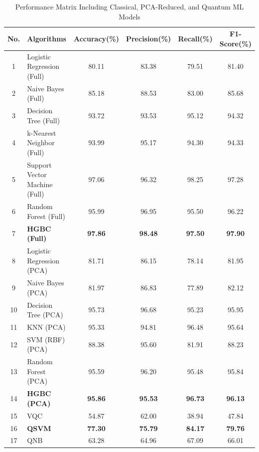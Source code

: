 \documentclass[runningheads]{llncs}
\begin{document}
\begin{table}[!ht]
    \centering
    \caption{Performance Matrix Including Classical, PCA-Reduced, and Quantum ML Models}
    \renewcommand{\arraystretch}{1.2}
    \setlength{\tabcolsep}{4pt}
    \begin{tabular}{|c|l|c|c|c|c|}
        \hline
        \textbf{No.} & \textbf{Algorithms} & \textbf{Accuracy(\%)} & \textbf{Precision(\%)} & \textbf{Recall(\%)} & \textbf{F1-Score(\%)} \\
        \hline
          1  & Logistic Regression (Full) & 80.11 & 83.38 & 79.51 & 81.40 \\
          \hline
          2 & Naive Bayes (Full) & 85.18 & 88.53 & 83.00 & 85.68 \\
          \hline
          3 & Decision Tree (Full) & 93.72 & 93.53 & 95.12 & 94.32 \\
          \hline
          4 & k-Nearest Neighbor (Full) & 93.99 & 95.17 & 94.30 & 94.33 \\
          \hline
          5 & Support Vector Machine (Full) & 97.06 & 96.32 & 98.25 & 97.28 \\
          \hline
          6 & Random Forest (Full) & 95.99 & 96.95 & 95.50 & 96.22 \\
          \hline
          7 & \textbf{HGBC (Full)} & \textbf{97.86} & \textbf{98.48} & \textbf{97.50} & \textbf{97.90} \\
          \hline
          8 & Logistic Regression (PCA) & 81.71 & 86.15 & 78.14 & 81.95 \\
          \hline
          9 & Naive Bayes (PCA) & 81.97 & 86.83 & 77.89 & 82.12 \\
          \hline
          10 & Decision Tree (PCA) & 95.73 & 96.68 & 95.23 & 95.95 \\
          \hline
          11 & KNN (PCA) & 95.33 & 94.81 & 96.48 & 95.64 \\
          \hline
          12 & SVM (RBF) (PCA) & 88.38 & 95.60 & 81.91 & 88.23 \\
          \hline
          13 & Random Forest (PCA) & 95.59 & 96.20 & 95.48 & 95.84 \\
          \hline
          14 & \textbf{HGBC (PCA)} & \textbf{95.86} & \textbf{95.53} & \textbf{96.73} & \textbf{96.13} \\
          \hline
          15 & VQC & 54.87 & 62.00 & 38.94 & 47.84 \\
          \hline
          16 & \textbf{QSVM} & \textbf{77.30} & \textbf{75.79} & \textbf{84.17} & \textbf{79.76} \\
          \hline
          17 & QNB & 63.28 & 64.96 & 67.09 & 66.01 \\
          \hline
    \end{tabular}
    \label{tab:Performance_Matrix_Combined}
\end{table}
\end{document}
